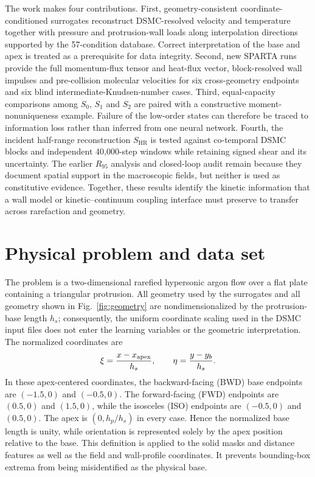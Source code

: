 \documentclass[aip,pof,preprint,notitlepage,floatfix,amsmath,amssymb]{revtex4-2}
\begin{document}
The work makes four contributions. First, geometry-consistent coordinate-conditioned surrogates reconstruct DSMC-resolved velocity and temperature together with pressure and protrusion-wall loads along interpolation directions supported by the 57-condition database. Correct interpretation of the base and apex is treated as a prerequisite for data integrity. Second, new SPARTA runs provide the full momentum-flux tensor and heat-flux vector, block-resolved wall impulses and pre-collision molecular velocities for six cross-geometry endpoints and six blind intermediate-Knudsen-number cases. Third, equal-capacity comparisons among $S_0$, $S_1$ and $S_2$ are paired with a constructive moment-nonuniqueness example. Failure of the low-order states can therefore be traced to information loss rather than inferred from one neural network. Fourth, the incident half-range reconstruction $S_{\mathrm{HR}}$ is tested against co-temporal DSMC blocks and independent 40,000-step windows while retaining signed shear and its uncertainty. The earlier $R_{95}$ analysis and closed-loop audit remain because they document spatial support in the macroscopic fields, but neither is used as constitutive evidence. Together, these results identify the kinetic information that a wall model or kinetic--continuum coupling interface must preserve to transfer across rarefaction and geometry.

\section{Physical problem and data set}
The problem is a two-dimensional rarefied hypersonic argon flow over a flat plate containing a triangular protrusion. All geometry used by the surrogates and all geometry shown in Fig.~\ref{fig:geometry} are nondimensionalized by the protrusion-base length $h_s$; consequently, the uniform coordinate scaling used in the DSMC input files does not enter the learning variables or the geometric interpretation. The normalized coordinates are
\begin{equation}
 \xi=\frac{x-x_{\rm apex}}{h_s}, \qquad \eta=\frac{y-y_b}{h_s}.
\end{equation}
In these apex-centered coordinates, the backward-facing (BWD) base endpoints are $(-1.5,0)$ and $(-0.5,0)$. The forward-facing (FWD) endpoints are $(0.5,0)$ and $(1.5,0)$, while the isosceles (ISO) endpoints are $(-0.5,0)$ and $(0.5,0)$. The apex is $(0,h_p/h_s)$ in every case. Hence the normalized base length is unity, while orientation is represented solely by the apex position relative to the base. This definition is applied to the solid masks and distance features as well as the field and wall-profile coordinates. It prevents bounding-box extrema from being misidentified as the physical base.
\end{document}
